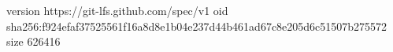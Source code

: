 version https://git-lfs.github.com/spec/v1
oid sha256:f924efaf37525561f16a8d8e1b04e237d44b461ad67c8e205d6c51507b275572
size 626416
